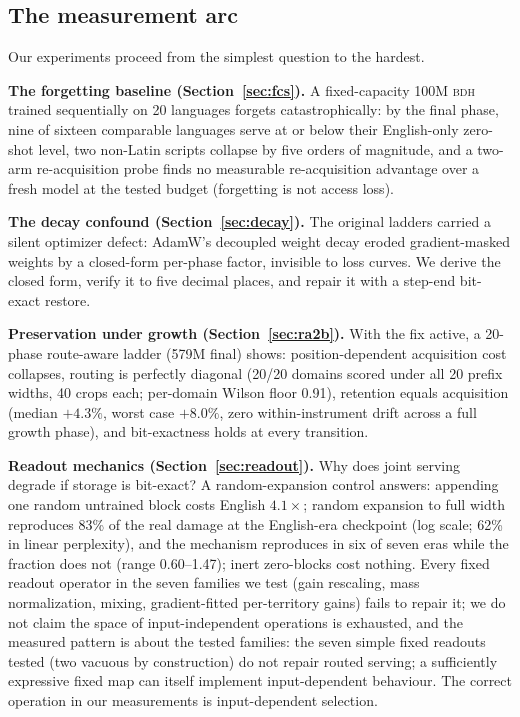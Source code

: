 \documentclass[11pt]{article}
\theoremstyle{definition}\newtheorem{definition}{Definition}
\theoremstyle{remark}\newtheorem{remark}{Remark}
\newcommand{\BDH}{\textsc{bdh}}
\begin{document}
\subsection{The measurement arc}

Our experiments proceed from the simplest question to the hardest.

\textbf{The forgetting baseline (Section~\ref{sec:fcs}).} A fixed-capacity 100M \BDH{} trained sequentially on 20 languages forgets catastrophically: by the final phase, nine of sixteen comparable languages serve at or below their English-only zero-shot level, two non-Latin scripts collapse by five orders of magnitude, and a two-arm re-acquisition probe finds no measurable re-acquisition advantage over a fresh model at the tested budget (forgetting is not access loss).

\textbf{The decay confound (Section~\ref{sec:decay}).} The original ladders carried a silent optimizer defect: AdamW's decoupled weight decay eroded gradient-masked weights by a closed-form per-phase factor, invisible to loss curves. We derive the closed form, verify it to five decimal places, and repair it with a step-end bit-exact restore.

\textbf{Preservation under growth (Section~\ref{sec:ra2b}).} With the fix active, a 20-phase route-aware ladder (579M final) shows: position-dependent acquisition cost collapses, routing is perfectly diagonal (20/20 domains scored under all 20 prefix widths, 40 crops each; per-domain Wilson floor 0.91), retention equals acquisition (median $+4.3\%$, worst case $+8.0\%$, zero within-instrument drift across a full growth phase), and bit-exactness holds at every transition.

\textbf{Readout mechanics (Section~\ref{sec:readout}).} Why does joint serving degrade if storage is bit-exact? A random-expansion control answers: appending one random untrained block costs English $4.1\times$; random expansion to full width reproduces 83\% of the real damage at the English-era checkpoint (log scale; 62\% in linear perplexity), and the mechanism reproduces in six of seven eras while the fraction does not (range 0.60--1.47); inert zero-blocks cost nothing. Every fixed readout operator in the seven families we test (gain rescaling, mass normalization, mixing, gradient-fitted per-territory gains) fails to repair it; we do not claim the space of input-independent operations is exhausted, and the measured pattern is about the tested families: the seven simple fixed readouts tested (two vacuous by construction) do not repair routed serving; a sufficiently expressive fixed map can itself implement input-dependent behaviour. The correct operation in our measurements is input-dependent selection.
\end{document}
